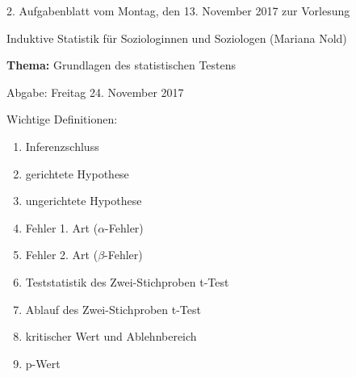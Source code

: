 \documentclass[11pt]{article}
\newcommand{\VORLESUNG}{Induktive Statistik für Soziologinnen und Soziologen}
\newcommand{\STAFF}{Mariana Nold}
\newcommand{\ASSIGNMENT}{2}
\newcommand{\HANDOUT}{Montag, den 13. November   2017}
\newcommand{\DELIVER}{Freitag 24. November 2017}
\newcommand{\PRACTICAL}[1]{\marginpar{\tiny {\bf Aufgabe \\ abgeben!} #1}}
\newcommand{\titel}{Grundlagen des statistischen Testens}
\begin{document}

\begin{center}
\ASSIGNMENT{}. Aufgabenblatt vom \HANDOUT{} zur Vorlesung 
\vspace*{0.5cm}

{\Large \VORLESUNG{}}
(\STAFF{}) 


\vspace*{0.5cm}
{\textbf{Thema:} \titel{}\\}
\vspace*{0.2cm}

{\small Abgabe: \DELIVER{}}
\vspace*{1cm}
\end{center}

Wichtige Definitionen:
\begin{enumerate}
\item{Inferenzschluss}
\item{gerichtete Hypothese}
\item{ungerichtete Hypothese}
\item{Fehler 1. Art ($\alpha$-Fehler)}
\item{Fehler 2. Art ($\beta$-Fehler)}
\item{Teststatistik des Zwei-Stichproben t-Test}
\item{Ablauf des Zwei-Stichproben t-Test}
\item{kritischer Wert und Ablehnbereich}
\item{p-Wert}
\end{enumerate}
\vspace{2cm}
\end{document}
